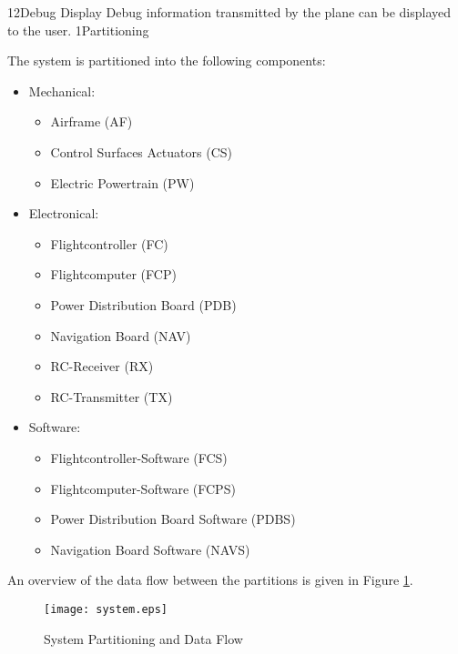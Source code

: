     {}
    {}
\req
    {12}{Debug Display}
    {
        Debug information transmitted by the plane can be displayed
        to the user.
    }
    {}
    {}
\dd
    {1}{Partitioning}
    {
        The system is partitioned into the following components:
        \begin{itemize}
            \item Mechanical:
                \begin{itemize}
                    \item Airframe (AF)
                    \item Control Surfaces Actuators (CS) 
                    \item Electric Powertrain (PW)
                \end{itemize}
            \item Electronical:
                \begin{itemize}
                    \item Flightcontroller (FC)
                    \item Flightcomputer (FCP)
                    \item Power Distribution Board (PDB)
                    \item Navigation Board (NAV)
                    \item RC-Receiver (RX)
                    \item RC-Transmitter (TX)
                \end{itemize}
            \item Software:
                \begin{itemize}
                    \item Flightcontroller-Software (FCS)
                    \item Flightcomputer-Software (FCPS)
                    \item Power Distribution Board Software (PDBS)
                    \item Navigation Board Software (NAVS)
                \end{itemize}
        \end{itemize}

        An overview of the data flow between the partitions is 
        given in Figure \ref{fig:sys-hl:partition}.
        \begin{figure}[H]
            \centering
            \texttt{[image: system.eps]}
            \caption{System Partitioning and Data Flow}
            \label{fig:sys-hl:partition}
        \end{figure}
    }
